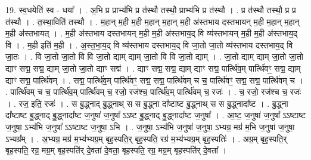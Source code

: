 \documentclass[17pt]{extarticle}
\begin{document}
19. स्व॒धयेति॑ स्व - धया᳚ । . अ॒भि प्र प्राभ्य॑भि प्र त॑स्थौ तस्थौ॒ प्राभ्य॑भि प्र त॑स्थौ । . प्र त॑स्थौ तस्थौ॒ प्र प्र त॑स्थौ । . त॒स्था॒विति॑ तस्थौ । . म॒हान् म॒ही म॒ही म॒हान् म॒हान् म॒ही अ॑स्तभाय दस्तभायन् म॒ही म॒हान् म॒हान् म॒ही अ॑स्तभायत् । . म॒ही अ॑स्तभाय दस्तभायन् म॒ही म॒ही अ॑स्तभाय॒द् वि व्य॑स्तभायन् म॒ही म॒ही अ॑स्तभाय॒द् वि । . म॒ही इति॑ म॒ही । . अ॒स्त॒भा॒य॒द् वि व्य॑स्तभाय दस्तभाय॒द् वि जा॒तो जा॒तो व्य॑स्तभाय दस्तभाय॒द् वि जा॒तः । . वि जा॒तो जा॒तो वि वि जा॒तो द्याम् द्याम् जा॒तो वि वि जा॒तो द्याम् । . जा॒तो द्याम् द्याम् जा॒तो जा॒तो द्याꣳ सद्म॒ सद्म॒ द्याम् जा॒तो जा॒तो द्याꣳ सद्म॑ । . द्याꣳ सद्म॒ सद्म॒ द्याम् द्याꣳ सद्म॒ पार्त्थि॑व॒म् पार्त्थि॑वꣳ॒॒ सद्म॒ द्याम् द्याꣳ सद्म॒ पार्त्थि॑वम् । . सद्म॒ पार्त्थि॑व॒म् पार्त्थि॑वꣳ॒॒ सद्म॒ सद्म॒ पार्त्थि॑वम् च च॒ पार्त्थि॑वꣳ॒॒ सद्म॒ सद्म॒ पार्त्थि॑वम् च । . पार्त्थि॑वम् च च॒ पार्त्थि॑व॒म् पार्त्थि॑वम् च॒ रजो॒ रज॑श्च॒ पार्त्थि॑व॒म् पार्त्थि॑वम् च॒ रजः॑ । . च॒ रजो॒ रज॑श्च च॒ रजः॑ । . रज॒ इति॒ रजः॑ । . स बु॒द्ध्नाद् बु॒द्ध्नाथ् स स बु॒द्ध्ना दा᳚ष्टाष्ट बु॒द्ध्नाथ् स स बु॒द्ध्नादा᳚ष्ट । . बु॒द्ध्ना दा᳚ष्टाष्ट बु॒द्ध्नाद् बु॒द्ध्नादा᳚ष्ट ज॒नुषा॑ ज॒नुषा᳚ ऽऽष्ट बु॒द्ध्नाद् बु॒द्ध्नादा᳚ष्ट ज॒नुषा᳚ । . आ॒ष्ट॒ ज॒नुषा॑ ज॒नुषा᳚ ऽऽष्टाष्ट ज॒नुषा॒ ऽभ्य॑भि ज॒नुषा᳚ ऽऽष्टाष्ट ज॒नुषा॒ ऽभि । . ज॒नुषा॒ ऽभ्य॑भि ज॒नुषा॑ ज॒नुषा॒ ऽभ्यग्र॒ मग्र॑ म॒भि ज॒नुषा॑ ज॒नुषा॒ ऽभ्यग्र᳚म् । . अ॒भ्यग्र॒ मग्र॑ म॒भ्य॑भ्यग्र॒म् बृह॒स्पति॒र् बृह॒स्पति॒ रग्र॑ म॒भ्य॑भ्यग्र॒म् बृह॒स्पतिः॑ । . अग्र॒म् बृह॒स्पति॒र् बृह॒स्पति॒ रग्र॒ मग्र॒म् बृह॒स्पति॑र् दे॒वता॑ दे॒वता॒ बृह॒स्पति॒ रग्र॒ मग्र॒म् बृह॒स्पति॑र् दे॒वता᳚ । \newline
\end{document}
